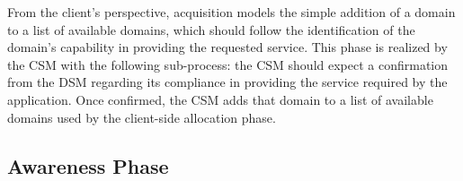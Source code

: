 
From the client's perspective, acquisition models the simple addition of a domain to a list of available domains, which should follow the identification of the domain's capability in providing the requested service. This phase is realized by the CSM with the following sub-process: the CSM should expect a confirmation from the DSM regarding its compliance in providing the service required by the application. Once confirmed, the CSM adds that domain to a list of available domains used by the client-side allocation phase. 






\subsection*{Awareness Phase}\label{sec:A3-E-awareness}



